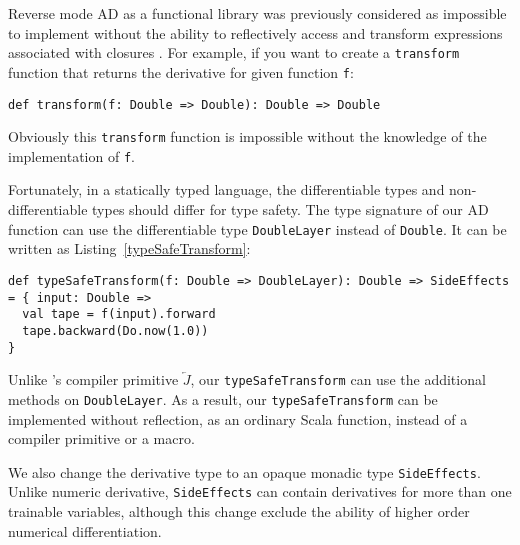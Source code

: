 Reverse mode AD as a functional library was previously considered as impossible to implement without the ability to reflectively access and transform expressions associated with closures \cite{pearlmutter2008reverse}. For example, if you want to create a \lstinline{transform} function that returns the derivative for given function \lstinline{f}:

\begin{lstlisting}[float={h t b p},caption={Impossible transform function for AD}, label={transform}]
def transform(f: Double => Double): Double => Double
\end{lstlisting}

Obviously this \lstinline{transform} function is impossible without the knowledge of the implementation of \lstinline{f}.

Fortunately, in a statically typed language, the differentiable types and non-differentiable types should differ for type safety. The type signature of our AD function can use the differentiable type \lstinline{DoubleLayer} instead of \lstinline{Double}. It can be written as Listing~\ref{typeSafeTransform}:

\begin{lstlisting}[float={h t b p},caption={Type safe transform function for AD}, label={typeSafeTransform}]
def typeSafeTransform(f: Double => DoubleLayer): Double => SideEffects = { input: Double =>
  val tape = f(input).forward
  tape.backward(Do.now(1.0))
}
\end{lstlisting}

Unlike \cite{pearlmutter2008reverse}'s compiler primitive $\overleftarrow{J}$, our \lstinline{typeSafeTransform} can use the additional methods on \lstinline{DoubleLayer}. As a result, our \lstinline{typeSafeTransform} can be implemented without reflection, as an ordinary Scala function, instead of a compiler primitive or a macro.

We also change the derivative type to an opaque monadic type \lstinline{SideEffects}. Unlike numeric derivative, \lstinline{SideEffects} can contain derivatives for more than one \glspl{trainable variable}, although this change exclude the ability of higher order numerical differentiation.



